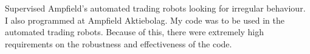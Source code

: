 Supervised Ampfield's automated trading robots looking for irregular behaviour.
I also programmed at Ampfield Aktiebolag.
My code was to be used in the automated trading robots.
Because of this, there were extremely high requirements on the robustness and effectiveness of the code.